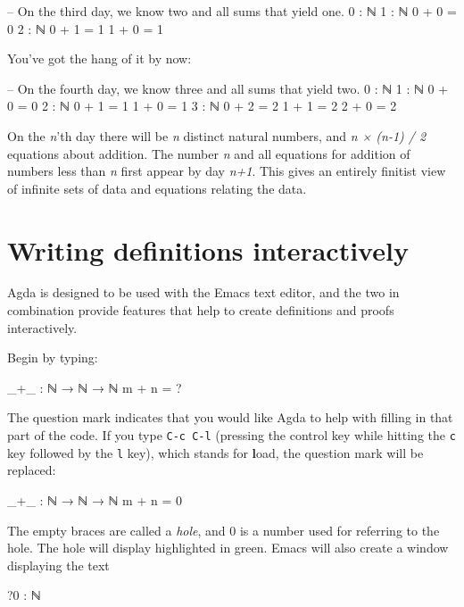 \begin{myDisplay}
-- On the third day, we know two and all sums that yield one.
0 : ℕ
1 : ℕ    0 + 0 = 0
2 : ℕ    0 + 1 = 1   1 + 0 = 1
\end{myDisplay}

You've got the hang of it by now:

\begin{myDisplay}
-- On the fourth day, we know three and all sums that yield two.
0 : ℕ
1 : ℕ    0 + 0 = 0
2 : ℕ    0 + 1 = 1   1 + 0 = 1
3 : ℕ    0 + 2 = 2   1 + 1 = 2    2 + 0 = 2
\end{myDisplay}

On the \emph{n}'th day there will be \emph{n} distinct natural numbers,
and \emph{n × (n-1) / 2} equations about addition. The number \emph{n}
and all equations for addition of numbers less than \emph{n} first
appear by day \emph{n+1}. This gives an entirely finitist view of
infinite sets of data and equations relating the data.

\hypertarget{writing-definitions-interactively}{%
\section{Writing definitions
interactively}\label{writing-definitions-interactively}}

Agda is designed to be used with the Emacs text editor, and the two in
combination provide features that help to create definitions and proofs
interactively.

Begin by typing:

\begin{myDisplay}
_+_ : ℕ → ℕ → ℕ
m + n = ?
\end{myDisplay}

The question mark indicates that you would like Agda to help with
filling in that part of the code. If you type \texttt{C-c\ C-l}
(pressing the control key while hitting the \texttt{c} key followed by
the \texttt{l} key), which stands for \textbf{l}oad, the question mark
will be replaced:

\begin{myDisplay}
_+_ : ℕ → ℕ → ℕ
m + n = { }0
\end{myDisplay}

The empty braces are called a \emph{hole}, and 0 is a number used for
referring to the hole. The hole will display highlighted in green. Emacs
will also create a window displaying the text

\begin{myDisplay}
?0 : ℕ
\end{myDisplay}

